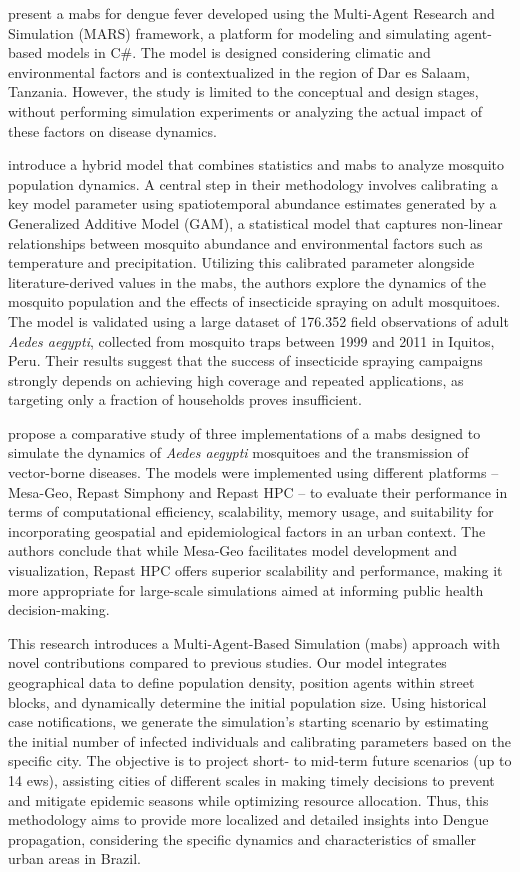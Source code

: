 \cite{Pascoe2023} present a \gls{mabs} for dengue fever developed using the
Multi-Agent Research and Simulation (MARS) framework, a platform for modeling
and simulating agent-based models in C\#. The model is designed considering
climatic and environmental factors and is contextualized in the region of Dar es
Salaam, Tanzania. However, the study is limited to the conceptual and design
stages, without performing simulation experiments or analyzing the actual impact
of these factors on disease dynamics.

\cite{Cavany2023} introduce a hybrid model that combines statistics and
\gls{mabs} to analyze mosquito population dynamics. A central step in their
methodology involves calibrating a key model parameter using spatiotemporal
abundance estimates generated by a Generalized Additive Model (GAM), a
statistical model that captures non-linear relationships between mosquito
abundance and environmental factors such as temperature and precipitation.
Utilizing this calibrated parameter alongside literature-derived values in the
\gls{mabs}, the authors explore the dynamics of the mosquito population and the
effects of insecticide spraying on adult mosquitoes. The model is validated
using a large dataset of 176.352 field observations of adult \textit{Aedes
	aegypti}, collected from mosquito traps between 1999 and 2011 in Iquitos, Peru.
Their results suggest that the success of insecticide spraying campaigns
strongly depends on achieving high coverage and repeated applications, as
targeting only a fraction of households proves insufficient.


\cite{Uribe2023} propose a comparative study of three implementations of a
\gls{mabs} designed to simulate the dynamics of \textit{Aedes aegypti}
mosquitoes and the transmission of vector-borne diseases. The models were
implemented using different platforms -- Mesa-Geo, Repast Simphony and Repast
HPC -- to evaluate their performance in terms of computational efficiency,
scalability, memory usage, and suitability for incorporating geospatial and
epidemiological factors in an urban context. The authors conclude that while
Mesa-Geo facilitates model development and visualization, Repast HPC offers
superior scalability and performance, making it more appropriate for large-scale
simulations aimed at informing public health decision-making.

This research introduces a Multi-Agent-Based Simulation (\gls{mabs}) approach
with novel contributions compared to previous studies. Our model integrates
geographical data to define population density, position agents within street
blocks, and dynamically determine the initial population size. Using historical
case notifications, we generate the simulation’s starting scenario by estimating
the initial number of infected individuals and calibrating parameters based on
the specific city. The objective is to project short- to mid-term future
scenarios (up to 14 \gls{ews}), assisting cities of different scales in making
timely decisions to prevent and mitigate epidemic seasons while optimizing
resource allocation. Thus, this methodology aims to provide more localized and
detailed insights into Dengue propagation, considering the specific dynamics and
characteristics of smaller urban areas in Brazil.

